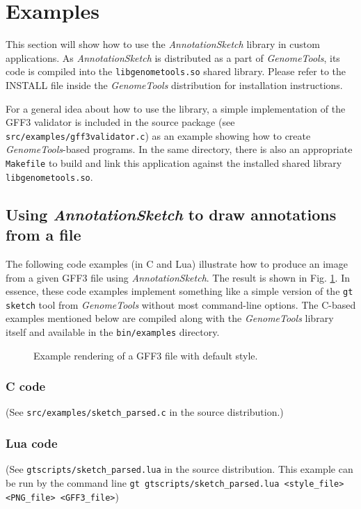 \documentclass[a4paper]{scrreprt}
\begin{document}
\section{Examples}

This section will show how to use the \emph{AnnotationSketch} library in custom applications. As \emph{AnnotationSketch} is distributed as a part of \emph{GenomeTools}, its code is compiled into the \texttt{lib\-ge\-nome\-tools.so} shared library. Please refer to the INSTALL file inside the \emph{GenomeTools} distribution for installation instructions.

For a general idea about how to use the library, a simple implementation of the GFF3 validator is included in the source package (see \texttt{src/examples/gff3validator.c}) as an example showing how to create \emph{GenomeTools}-based programs. In the same directory, there is also an appropriate \texttt{Makefile} to build and link this application against the installed shared library \texttt{libgenometools.so}.

\subsection{Using \emph{AnnotationSketch} to draw annotations from a file}
The following code examples (in C and Lua) illustrate how to produce an image from a given GFF3 file using \emph{AnnotationSketch}. The result is shown in Fig. \ref{parsed_img}. In essence, these code examples implement something like a simple version of the \texttt{gt sketch} tool from \emph{GenomeTools} without most command-line options. The C-based examples mentioned below are compiled along with the \emph{GenomeTools} library itself and available in the \texttt{bin/examples} directory.

\begin{figure}
\caption{Example rendering of a GFF3 file with default style.}
\label{parsed_img}
\end{figure}

\subsubsection{C code}
(See \texttt{src/examples/sketch\_parsed.c} in the source distribution.)

\subsubsection{Lua code}
(See \texttt{gtscripts/sketch\_parsed.lua} in the source distribution. This example can be run by the command line \texttt{gt gtscripts/sketch\_parsed.lua <style\_file> <PNG\_file> <GFF3\_file>})

\end{document}
